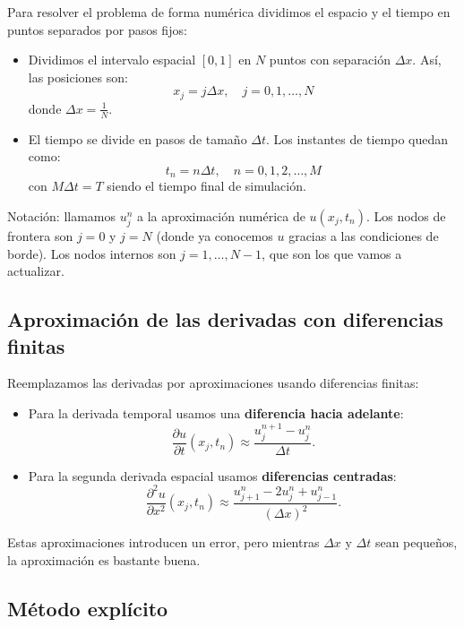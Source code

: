 \documentclass[12pt,a4paper]{article}
\begin{document}
Para resolver el problema de forma numérica dividimos el espacio y el tiempo en puntos separados por pasos fijos:

\begin{itemize}
    \item Dividimos el intervalo espacial $[0,1]$ en $N$ puntos con separación $\Delta x$.  
    Así, las posiciones son:
    \[
    x_j = j\Delta x, \quad j = 0,1,\dots,N
    \]
    donde $\Delta x = \tfrac{1}{N}$.
    
    \item El tiempo se divide en pasos de tamaño $\Delta t$.  
    Los instantes de tiempo quedan como:
    \[
    t_n = n\Delta t, \quad n = 0,1,2,\dots,M
    \]
    con $M\Delta t = T$ siendo el tiempo final de simulación.
\end{itemize}

Notación: llamamos $u_j^n$ a la aproximación numérica de $u(x_j,t_n)$.  
Los nodos de frontera son $j=0$ y $j=N$ (donde ya conocemos $u$ gracias a las condiciones de borde). Los nodos internos son $j=1,\dots,N-1$, que son los que vamos a actualizar.

\subsection{Aproximación de las derivadas con diferencias finitas}

Reemplazamos las derivadas por aproximaciones usando diferencias finitas:

\begin{itemize}
    \item Para la derivada temporal usamos una \textbf{diferencia hacia adelante}:
    \[
    \frac{\partial u}{\partial t}(x_j,t_n) \approx \frac{u_j^{n+1}-u_j^n}{\Delta t}.
    \]

    \item Para la segunda derivada espacial usamos \textbf{diferencias centradas}:
    \[
    \frac{\partial^2 u}{\partial x^2}(x_j,t_n) \approx \frac{u_{j+1}^n - 2u_j^n + u_{j-1}^n}{(\Delta x)^2}.
    \]
\end{itemize}

Estas aproximaciones introducen un error, pero mientras $\Delta x$ y $\Delta t$ sean pequeños, la aproximación es bastante buena.

\subsection{Método explícito}
\end{document}

